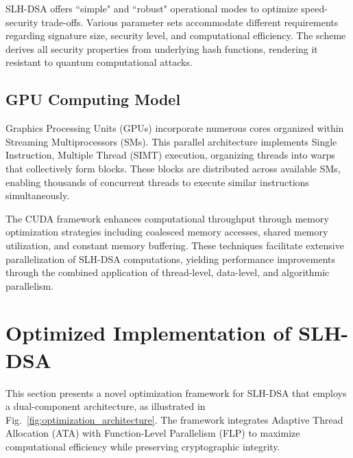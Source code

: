 \documentclass[journal]{IEEEtran}
\begin{document}
SLH-DSA offers ``simple" and ``robust" operational modes to optimize speed-security trade-offs. Various parameter sets accommodate different requirements regarding signature size, security level, and computational efficiency. The scheme derives all security properties from underlying hash functions, rendering it resistant to quantum computational attacks.

\subsection{GPU Computing Model}

Graphics Processing Units (GPUs) incorporate numerous cores organized within Streaming Multiprocessors (SMs). This parallel architecture implements Single Instruction, Multiple Thread (SIMT) execution, organizing threads into warps that collectively form blocks. These blocks are distributed across available SMs, enabling thousands of concurrent threads to execute similar instructions simultaneously.

The CUDA framework enhances computational throughput through memory optimization strategies including coalesced memory accesses, shared memory utilization, and constant memory buffering. These techniques facilitate extensive parallelization of SLH-DSA computations, yielding performance improvements through the combined application of thread-level, data-level, and algorithmic parallelism.

\section{Optimized Implementation of SLH-DSA}\label{sec:implementation}

This section presents a novel optimization framework for SLH-DSA that employs a dual-component architecture, as illustrated in Fig.~\ref{fig:optimization_architecture}. The framework integrates Adaptive Thread Allocation (ATA) with Function-Level Parallelism (FLP) to maximize computational efficiency while preserving cryptographic integrity.
\end{document}
